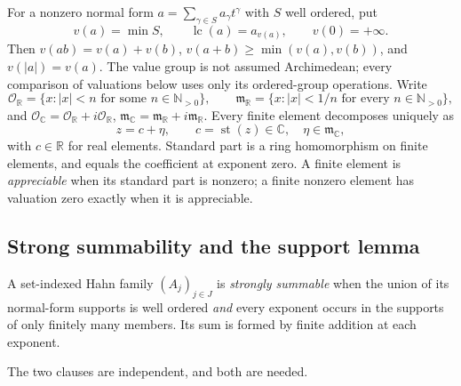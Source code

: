 \documentclass[11pt,letterpaper]{article}
\numberwithin{equation}{section}
\theoremstyle{definition}
\theoremstyle{remark}
\newcommand{\R}{\mathbb R}
\newcommand{\C}{\mathbb C}
\newcommand{\N}{\mathbb N}
\newcommand{\OO}{\mathcal O}
\newcommand{\mm}{\mathfrak m}
\newcommand{\st}{\operatorname{st}}
\newcommand{\lc}{\operatorname{lc}}
\begin{document}
For a nonzero normal form $a=\sum_{\gamma\in S}a_\gamma t^\gamma$ with $S$ well ordered, put
\[
 v(a)=\min S,\qquad \lc(a)=a_{v(a)},\qquad v(0)=+\infty .
\]
Then $v(ab)=v(a)+v(b)$, $v(a+b)\ge\min(v(a),v(b))$, and $v(|a|)=v(a)$. The value group is not
assumed Archimedean; every comparison of valuations below uses only its ordered-group operations.
Write
\[
 \OO_{\R}=\{x:|x|<n\text{ for some }n\in\N_{>0}\},\qquad
 \mm_{\R}=\{x:|x|<1/n\text{ for every }n\in\N_{>0}\},
\]
and $\OO_{\C}=\OO_{\R}+i\OO_{\R}$, $\mm_{\C}=\mm_{\R}+i\mm_{\R}$. Every finite element decomposes
uniquely as
\begin{equation}\label{trigonometry:eq:standard}
 z=c+\eta,\qquad c=\st(z)\in\C,\quad\eta\in\mm_{\C},
\end{equation}
with $c\in\R$ for real elements. Standard part is a ring homomorphism on finite elements, and
equals the coefficient at exponent zero. A finite element is \emph{appreciable} when its standard
part is nonzero; a finite nonzero element has valuation zero exactly when it is appreciable.

\subsection{Strong summability and the support lemma}
\begin{definition}\label{trigonometry:def:strong}
A set-indexed Hahn family $(A_j)_{j\in J}$ is \emph{strongly summable} when the union of its
normal-form supports is well ordered \emph{and} every exponent occurs in the supports of only
finitely many members. Its sum is formed by finite addition at each exponent.
\end{definition}
The two clauses are independent, and both are needed.
\end{document}
